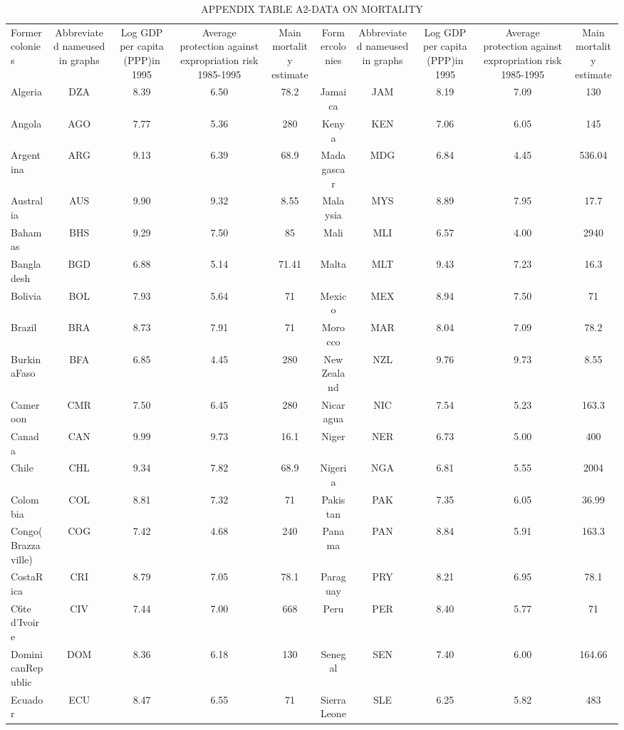 \begin{table}[htbp]
\centering
\caption{APPENDIX TABLE  A2-DATA ON MORTALITY}
\begin{tabular}{lccccccccc}
\hline
Formercolonies & Abbreviated nameused in graphs & Log GDP per capita (PPP)in 1995 & Average protection against expropriation risk 1985-1995 & Main mortality estimate & Formercolonies & Abbreviated nameused in graphs & Log GDP per capita (PPP)in 1995 & Average protection against expropriation risk 1985-1995 & Main mortality estimate \\
Algeria & DZA & 8.39 & 6.50 & 78.2 & Jamaica & JAM & 8.19 & 7.09 & 130 \\
Angola & AGO & 7.77 & 5.36 & 280 & Kenya & KEN & 7.06 & 6.05 & 145 \\
Argentina & ARG & 9.13 & 6.39 & 68.9 & Madagascar & MDG & 6.84 & 4.45 & 536.04 \\
Australia & AUS & 9.90 & 9.32 & 8.55 & Malaysia & MYS & 8.89 & 7.95 & 17.7 \\
Bahamas & BHS & 9.29 & 7.50 & 85 & Mali & MLI & 6.57 & 4.00 & 2940 \\
Bangladesh & BGD & 6.88 & 5.14 & 71.41 & Malta & MLT & 9.43 & 7.23 & 16.3 \\
Bolivia & BOL & 7.93 & 5.64 & 71 & Mexico & MEX & 8.94 & 7.50 & 71 \\
Brazil & BRA & 8.73 & 7.91 & 71 & Morocco & MAR & 8.04 & 7.09 & 78.2 \\
BurkinaFaso & BFA & 6.85 & 4.45 & 280 & New Zealand & NZL & 9.76 & 9.73 & 8.55 \\
Cameroon & CMR & 7.50 & 6.45 & 280 & Nicaragua & NIC & 7.54 & 5.23 & 163.3 \\
Canada & CAN & 9.99 & 9.73 & 16.1 & Niger & NER & 6.73 & 5.00 & 400 \\
Chile & CHL & 9.34 & 7.82 & 68.9 & Nigeria & NGA & 6.81 & 5.55 & 2004 \\
Colombia & COL & 8.81 & 7.32 & 71 & Pakistan & PAK & 7.35 & 6.05 & 36.99 \\
Congo(Brazzaville) & COG & 7.42 & 4.68 & 240 & Panama & PAN & 8.84 & 5.91 & 163.3 \\
CostaRica & CRI & 8.79 & 7.05 & 78.1 & Paraguay & PRY & 8.21 & 6.95 & 78.1 \\
C6te d'Ivoire & CIV & 7.44 & 7.00 & 668 & Peru & PER & 8.40 & 5.77 & 71 \\
DominicanRepublic & DOM & 8.36 & 6.18 & 130 & Senegal & SEN & 7.40 & 6.00 & 164.66 \\
Ecuador & ECU & 8.47 & 6.55 & 71 & SierraLeone & SLE & 6.25 & 5.82 & 483 \\

\end{tabular}
\end{table}

